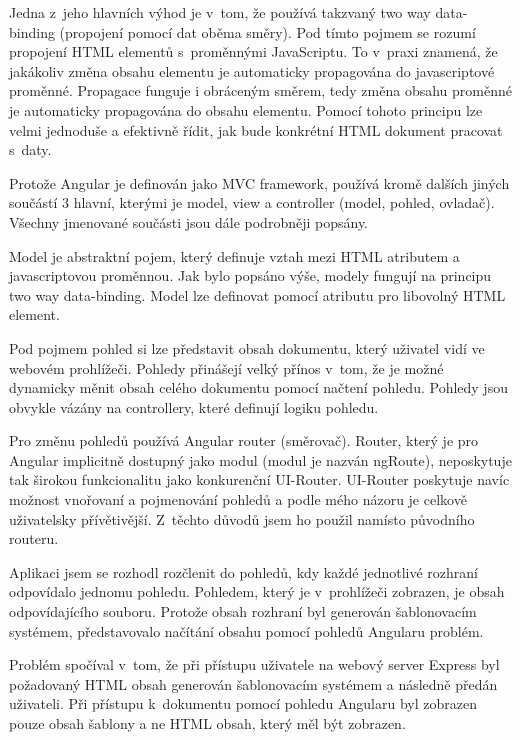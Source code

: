 \documentclass[thesis=M,czech]{FITthesis}[2012/06/26]
\begin{document}
      Jedna z~jeho hlavních výhod je v~tom, že používá takzvaný two way data-binding (propojení pomocí dat oběma směry).
      Pod tímto pojmem se rozumí propojení HTML elementů s~proměnnými JavaScriptu.
      To v~praxi znamená, 
      že jakákoliv změna obsahu elementu je automaticky propagována do javascriptové proměnné.
      Propagace funguje i obráceným směrem, 
      tedy změna obsahu proměnné je automaticky propagována do obsahu elementu.
      Pomocí tohoto principu lze velmi jednoduše a efektivně řídit,
      jak bude konkrétní HTML dokument pracovat s~daty.

      Protože Angular je definován jako MVC framework,
      používá kromě dalších jiných součástí 3 hlavní, kterými je model, view a controller (model, pohled, ovladač).
      Všechny jmenované součásti jsou dále podrobněji popsány.

      Model je abstraktní pojem, který definuje vztah mezi HTML atributem a javascriptovou proměnnou.
      Jak bylo popsáno výše, modely fungují na principu two way data-binding.
      Model lze definovat pomocí atributu pro libovolný HTML element.

      Pod pojmem pohled si lze představit obsah dokumentu, který uživatel vidí ve webovém prohlížeči.
      Pohledy přinášejí velký přínos v~tom, 
      že je možné dynamicky měnit obsah celého dokumentu pomocí načtení pohledu.
      Pohledy jsou obvykle vázány na controllery, které definují logiku pohledu.

      Pro změnu pohledů používá Angular router (směrovač).
      Router, který je pro Angular implicitně dostupný jako modul (modul je nazván ngRoute),
      neposkytuje tak širokou funkcionalitu jako konkurenční UI-Router.
      UI-Router poskytuje navíc možnost vnořovaní a pojmenování pohledů
      a podle mého názoru je celkově uživatelsky přívětivější.
      Z~těchto důvodů jsem ho použil namísto původního routeru.
      
      Aplikaci jsem se rozhodl rozčlenit do pohledů, kdy každé jednotlivé rozhraní odpovídalo jednomu pohledu.
      Pohledem, který je v~prohlížeči zobrazen, je obsah odpovídajícího souboru.
      Protože obsah rozhraní byl generován šablonovacím systémem,
      představovalo načítání obsahu pomocí pohledů Angularu problém.
      
      Problém spočíval v~tom, že při přístupu uživatele na webový server Express
      byl požadovaný HTML obsah generován šablonovacím systémem a následně předán uživateli.
      Při přístupu k~dokumentu pomocí pohledu Angularu
      byl zobrazen pouze obsah šablony a ne HTML obsah, který měl být zobrazen.
\end{document}
